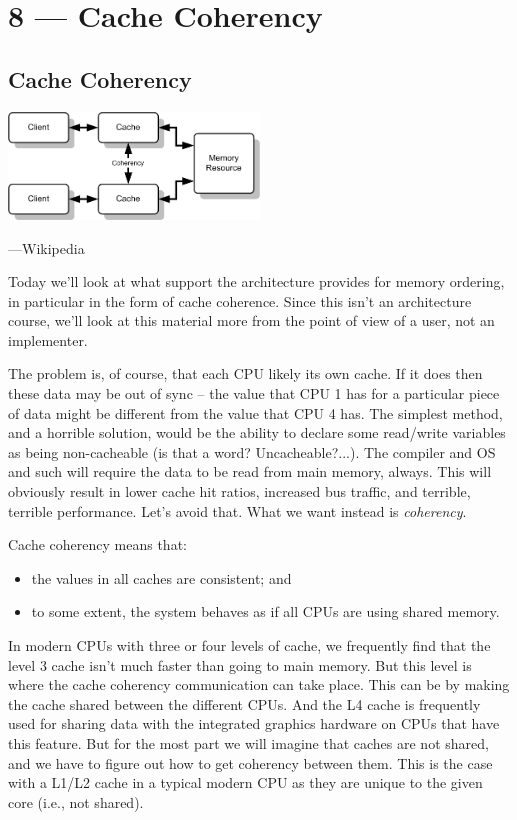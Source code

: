\documentclass[a4paper]{report}
\begin{document}
\chapter*{8 --- Cache Coherency}


\section*{Cache Coherency}

\begin{center}
    \includegraphics[width=0.5\textwidth]{images/coherency}

\hfill ---Wikipedia
\end{center}

Today we'll look at what support the architecture provides for memory ordering, in
particular in the form of cache coherence. Since this isn't an
architecture course, we'll look at this material more from the point
of view of a user, not an implementer.

The problem is, of course, that each CPU likely its own cache. If it does then these data may be out of sync -- the value that CPU 1 has for a particular piece of data might be different from the value that CPU 4 has. The simplest method, and a horrible solution, would be the ability to declare some read/write variables as being non-cacheable (is that a word? Uncacheable?...). The compiler and OS and such will require the data to be read from main memory, always. This will obviously result in lower cache hit ratios, increased bus traffic, and terrible, terrible performance. Let's avoid that. What we want instead is \textit{coherency}.

Cache coherency means that:
  \begin{itemize}
    \item the values in all caches are consistent; and
    \item to some extent, the system behaves as if all CPUs are using shared memory.
  \end{itemize}
  
In modern CPUs with three or four levels of cache, we frequently find that the level 3 cache isn't much faster than going to main memory. But this level is where the cache coherency communication can take place. This can be by making the cache shared between the different CPUs. And the L4 cache is frequently used for sharing data with the integrated graphics hardware on CPUs that have this feature. But for the most part we will imagine that caches are not shared, and we have to figure out how to get coherency between them. This is the case with a L1/L2 cache in a typical modern CPU as they are unique to the given core (i.e., not shared).
  
\end{document}
